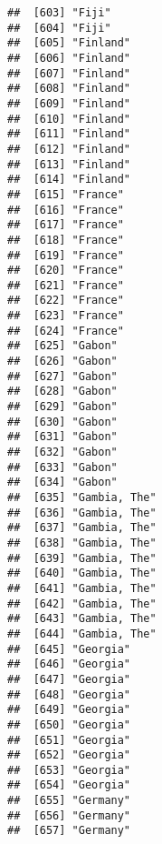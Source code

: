 \documentclass[]{article}
\begin{document}
\begin{verbatim}
##  [603] "Fiji"                               
##  [604] "Fiji"                               
##  [605] "Finland"                            
##  [606] "Finland"                            
##  [607] "Finland"                            
##  [608] "Finland"                            
##  [609] "Finland"                            
##  [610] "Finland"                            
##  [611] "Finland"                            
##  [612] "Finland"                            
##  [613] "Finland"                            
##  [614] "Finland"                            
##  [615] "France"                             
##  [616] "France"                             
##  [617] "France"                             
##  [618] "France"                             
##  [619] "France"                             
##  [620] "France"                             
##  [621] "France"                             
##  [622] "France"                             
##  [623] "France"                             
##  [624] "France"                             
##  [625] "Gabon"                              
##  [626] "Gabon"                              
##  [627] "Gabon"                              
##  [628] "Gabon"                              
##  [629] "Gabon"                              
##  [630] "Gabon"                              
##  [631] "Gabon"                              
##  [632] "Gabon"                              
##  [633] "Gabon"                              
##  [634] "Gabon"                              
##  [635] "Gambia, The"                        
##  [636] "Gambia, The"                        
##  [637] "Gambia, The"                        
##  [638] "Gambia, The"                        
##  [639] "Gambia, The"                        
##  [640] "Gambia, The"                        
##  [641] "Gambia, The"                        
##  [642] "Gambia, The"                        
##  [643] "Gambia, The"                        
##  [644] "Gambia, The"                        
##  [645] "Georgia"                            
##  [646] "Georgia"                            
##  [647] "Georgia"                            
##  [648] "Georgia"                            
##  [649] "Georgia"                            
##  [650] "Georgia"                            
##  [651] "Georgia"                            
##  [652] "Georgia"                            
##  [653] "Georgia"                            
##  [654] "Georgia"                            
##  [655] "Germany"                            
##  [656] "Germany"                            
##  [657] "Germany"                            

\end{verbatim}
\end{document}
